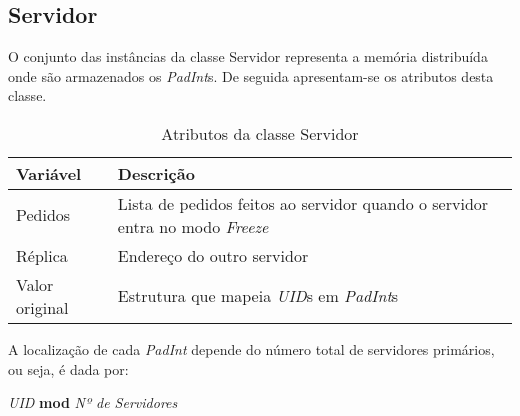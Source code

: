 \subsection{Servidor}
O conjunto das instâncias da classe Servidor representa a memória distribuída onde são armazenados os \textit{PadInt}s. De seguida apresentam-se os atributos desta classe.
\begin{table}[H]
\centering
\begin{tabular}{| p{2cm} | p{5cm} |}
\hline
\textbf{Variável} & \textbf{Descrição} \\
\hline
Pedidos & Lista de pedidos feitos ao servidor quando o servidor entra no modo \textit{Freeze} \\
\hline
Réplica & Endereço do outro servidor \\
\hline
Valor original & Estrutura que mapeia \textit{UID}s em \textit{PadInt}s \\
\hline
\end{tabular}
\caption{Atributos da classe Servidor}
\end{table}

A localização de cada \textit{PadInt} depende do número total de servidores primários, ou seja, é dada por:

\centerline{\textit{UID} \textbf{mod}  \textit{Nº de Servidores}}
